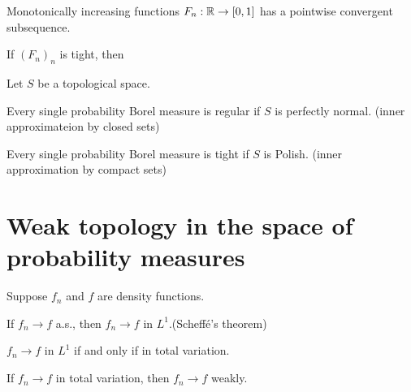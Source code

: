 \documentclass{../note}
\begin{document}
\begin{prb}
\end{prb}

\begin{prb}
\end{prb}

\begin{prb}
\end{prb}

\begin{prb}
\begin{parts}
\item Monotonically increasing functions $F_n:\mathbb{R}\to[0,1]$ has a pointwise convergent subsequence.
\item If $(F_n)_n$ is tight, then
\end{parts}
\end{prb}






\begin{prb}
Let $S$ be a topological space.
\begin{parts}
\item Every single probability Borel measure is regular if $S$ is perfectly normal. (inner approximateion by closed sets)
\item Every single probability Borel measure is tight if $S$ is Polish. (inner approximation by compact sets)
\end{parts}
\end{prb}





\section{Weak topology in the space of probability measures}


\begin{prb}
Suppose $f_n$ and $f$ are density functions.
\begin{parts}
\item If $f_n\to f$ a.s., then $f_n\to f$ in $L^1$.\hfill(Scheff\'e's theorem)
\item $f_n\to f$ in $L^1$ if and only if in total variation.
\item If $f_n\to f$ in total variation, then $f_n\to f$ weakly.
\end{parts}
\end{prb}
\end{document}
